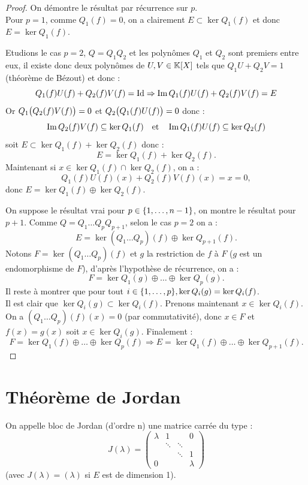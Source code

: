 \documentclass{article}
\begin{document}
\begin{proof}
On démontre le résultat par récurrence sur $p$. \\
Pour $p=1$, comme $Q_1(f) = 0$, on a clairement $E \subset \ker{Q_1(f)}$ et donc $E = \ker{Q_1(f)}$. \newline

Etudions le cas $p=2$, $Q = Q_1 Q_2$ et les polynômes $Q_1$ et $Q_2$ sont premiers entre eux, 
il existe donc deux polynômes de $U, V \in \mathbb{K}[X]$ tels que $Q_1 U + Q_2 V = 1$ (théorème de Bézout) et donc :
\[ Q_1(f) U(f) + Q_2(f) V(f) = \operatorname{Id} \Rightarrow \operatorname{Im}{ Q_1(f) U(f) + Q_2(f) V(f) } = E \] 
Or $Q_1 \bigl(  Q_2(f) V(f)  \bigr) = 0$ et $Q_2 \bigl(  Q_1(f) U(f)  \bigr) = 0$ donc :
\[ \operatorname{Im}{ Q_2(f) V(f) } \subseteq \ker{Q_1(f)} \quad \text{et} \quad \operatorname{Im}{ Q_1(f) U(f) } \subseteq \ker{Q_2(f)} \]
soit $E \subset \ker{Q_1(f)} +  \ker{Q_2(f)}$ donc :
\[ E =  \ker{Q_1(f)} +  \ker{Q_2(f)} . \]
Maintenant si $x \in \ker{Q_1(f)} \cap \ker{Q_2(f)}$, on a :
\[ Q_1(f) U(f)(x) + Q_2(f) V(f)(x) = x = 0 , \]
donc $E = \ker{Q_1(f)} \oplus \ker{Q_2(f)}$. \newline

On suppose le résultat vrai pour $p \in \{ 1, \dots, n-1 \}$, on montre le résultat pour $p+1$.
Comme $Q = Q_1 \dots Q_p Q_{p+1}$, selon le cas $p=2$ on a :
\[ E = \ker{(Q_1 \dots Q_p)(f)} \oplus \ker{Q_{p+1}(f)} . \]
Notons $F = \ker{(Q_1 \dots Q_p)(f)}$ et $g$ la restriction de $f$ à $F$ ($g$ est un endomorphisme de $F$),
d'après l'hypothèse de récurrence, on a :
\[ F = \ker{Q_1(g)} \oplus \dots \oplus \ker{Q_p(g)} . \]
Il reste à montrer que pour tout $i \in \{ 1, \dots, p  \}, \ker{Q_i(g)} = \ker{Q_i(f)}$. \\
Il est clair que $\ker{Q_i(g)} \subset \ker{Q_i(f)}$. Prenons maintenant $x \in \ker{Q_i(f)}$.
On a $(Q_1 \dots Q_p)(f)(x) = 0$ (par commutativité), donc $x \in F$ et $f(x) = g(x)$ soit $x \in \ker{Q_i(g)}$. Finalement :
\[ F = \ker{Q_1(f)} \oplus \dots \oplus \ker{Q_p(f)} \Rightarrow E = \ker{Q_1(f)} \oplus \dots \oplus \ker{Q_{p+1}(f)} . \]
\end{proof}

\section{Théorème de Jordan}

\begin{defn}
On appelle bloc de Jordan (d'ordre n) une matrice carrée du type :
\[ J(\lambda) = \begin{pmatrix}
\lambda & 1 & & 0 \\
 & \ddots & \ddots & \\
 & & \ddots & 1 \\
 0 & & & \lambda
\end{pmatrix} \]
(avec $J(\lambda) = (\lambda)$ si $E$ est de dimension 1).
\end{defn}
\end{document}
